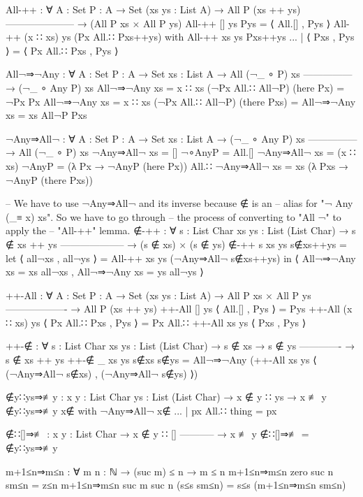 \begin{code}
  All-++ : ∀ {A : Set} {P : A → Set} (xs ys : List A)
    → All P (xs ++ ys)
      ---------------------
    → (All P xs × All P ys)
  All-++ [] ys Pys = ⟨ All.[] , Pys ⟩
  All-++ (x ∷ xs) ys (Px All.∷ Pxs++ys) with All-++ xs ys Pxs++ys
  ... | ⟨ Pxs , Pys ⟩ = ⟨ Px All.∷ Pxs , Pys ⟩

  All¬⇒¬Any : ∀ {A : Set} {P : A → Set} {xs : List A}
    → All (¬_ ∘ P) xs
      ---------------
    → (¬_ ∘ Any P) xs
  All¬⇒¬Any {xs = x ∷ xs} (¬Px All.∷ All¬P) (here Px) = ¬Px Px
  All¬⇒¬Any {xs = x ∷ xs} (¬Px All.∷ All¬P) (there Pxs) =
    All¬⇒¬Any {xs = xs} All¬P Pxs

  ¬Any⇒All¬ : ∀ {A : Set} {P : A → Set} {xs : List A}
    → (¬_ ∘ Any P) xs
      ---------------
    → All (¬_ ∘ P) xs
  ¬Any⇒All¬ {xs = []} ¬∘AnyP = All.[]
  ¬Any⇒All¬ {xs = (x ∷ xs)} ¬AnyP =
    (λ Px → ¬AnyP (here Px))
      All.∷ ¬Any⇒All¬ {xs = xs} (λ Pxs → ¬AnyP (there Pxs))

  -- We have to use ¬Any⇒All¬ and its inverse because ∉ is an
  -- alias for "¬ Any (_≡ x) xs".  So we have to go through
  -- the process of converting to "All ¬" to apply the
  -- "All-++" lemma.
  ∉-++ : ∀ {s : List Char} {xs ys : List (List Char)}
    → s ∉ xs ++ ys
      --------------------
    → (s ∉ xs) × (s ∉ ys)
  ∉-++ {s} {xs} {ys} s∉xs++ys =
    let ⟨ all¬xs , all¬ys ⟩ = All-++ xs ys (¬Any⇒All¬ s∉xs++ys) in
      ⟨ All¬⇒¬Any {xs = xs} all¬xs
      , All¬⇒¬Any {xs = ys} all¬ys ⟩

  ++-All : ∀ {A : Set} {P : A → Set} (xs ys : List A)
    → All P xs × All P ys
      -------------------
    → All P (xs ++ ys)
  ++-All [] ys ⟨ All.[] , Pys ⟩ = Pys
  ++-All (x ∷ xs) ys ⟨ Px All.∷ Pxs , Pys ⟩ =
    Px All.∷ ++-All xs ys ⟨ Pxs , Pys ⟩

  ++-∉ : ∀ {s : List Char} {xs ys : List (List Char)}
    → s ∉ xs
    → s ∉ ys
      -------------
    → s ∉ xs ++ ys
  ++-∉ {_} {xs} {ys} s∉xs s∉ys = All¬⇒¬Any
    (++-All xs ys ⟨ (¬Any⇒All¬ s∉xs) , (¬Any⇒All¬ s∉ys) ⟩)

  ∉y∷ys⇒≢y : {x y : List Char} {ys : List (List Char)}
    → x ∉ y ∷ ys
    → x ≢ y
  ∉y∷ys⇒≢y x∉ with ¬Any⇒All¬ x∉
  ... | px All.∷ thing = px

  ∉∷[]⇒≢ : {x y : List Char}
    → x ∉ y ∷ []
      -----------
    → x ≢ y
  ∉∷[]⇒≢ = ∉y∷ys⇒≢y

  m+1≤n⇒m≤n : ∀ {m n : ℕ} → (suc m) ≤ n → m ≤ n
  m+1≤n⇒m≤n {zero} {suc n} sm≤n = z≤n
  m+1≤n⇒m≤n {suc m} {suc n} (s≤s sm≤n) = s≤s (m+1≤n⇒m≤n sm≤n)
\end{code}
